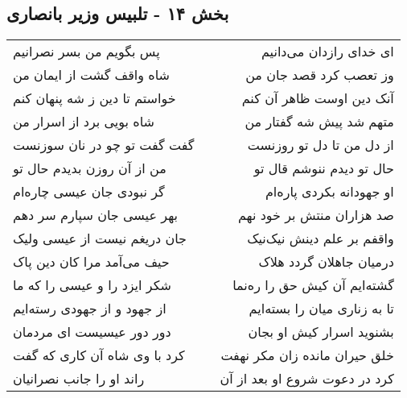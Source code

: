 \begin{center}
\section*{بخش ۱۴ - تلبیس وزیر بانصاری}
\label{sec:sh014}
\begin{longtable}{l p{0.5cm} r}
پس بگویم من بسر نصرانیم
&&
ای خدای رازدان می‌دانیم
\\
شاه واقف گشت از ایمان من
&&
وز تعصب کرد قصد جان من
\\
خواستم تا دین ز شه پنهان کنم
&&
آنک دین اوست ظاهر آن کنم
\\
شاه بویی برد از اسرار من
&&
متهم شد پیش شه گفتار من
\\
گفت گفت تو چو در نان سوزنست
&&
از دل من تا دل تو روزنست
\\
من از آن روزن بدیدم حال تو
&&
حال تو دیدم ننوشم قال تو
\\
گر نبودی جان عیسی چاره‌ام
&&
او جهودانه بکردی پاره‌ام
\\
بهر عیسی جان سپارم سر دهم
&&
صد هزاران منتش بر خود نهم
\\
جان دریغم نیست از عیسی ولیک
&&
واقفم بر علم دینش نیک‌نیک
\\
حیف می‌آمد مرا کان دین پاک
&&
درمیان جاهلان گردد هلاک
\\
شکر ایزد را و عیسی را که ما
&&
گشته‌ایم آن کیش حق را ره‌نما
\\
از جهود و از جهودی رسته‌ایم
&&
تا به زناری میان را بسته‌ایم
\\
دور دور عیسیست ای مردمان
&&
بشنوید اسرار کیش او بجان
\\
کرد با وی شاه آن کاری که گفت
&&
خلق حیران مانده زان مکر نهفت
\\
راند او را جانب نصرانیان
&&
کرد در دعوت شروع او بعد از آن
\\
\end{longtable}
\end{center}
